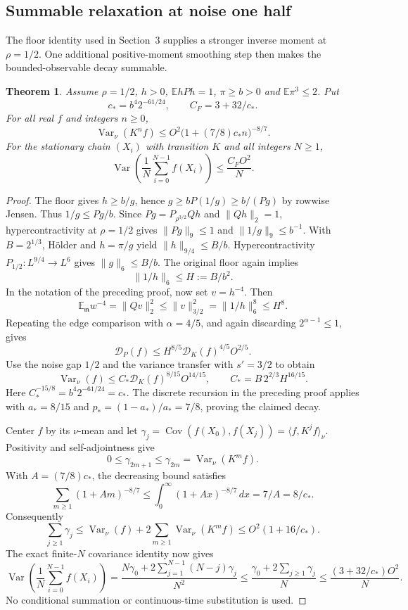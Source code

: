 \documentclass[11pt]{article}
\newcommand{\E}{\mathbb E}
\newtheorem{theorem}{Theorem}[section]
\begin{document}
\subsection{Summable relaxation at noise one half}
The floor identity used in Section~3 supplies a stronger inverse
moment at $\rho=1/2$. One additional positive-moment smoothing step
then makes the bounded-observable decay summable.
\begin{theorem}\label{summablerelaxation}
Assume $\rho=1/2$, $h>0$, $\E hPh=1$, $\pi\geq b>0$ and
$\E\pi^3\leq2$. Put
\[
 c_* = b^4 2^{-61/24},\qquad C_F=3+32/c_*.
\]
For all real $f$ and integers $n\geq0$,
\[
 \operatorname{Var}_\nu(K^n f)
 \leq O^2\bigl(1+(7/8)c_*n\bigr)^{-8/7}.
\]
For the stationary chain $(X_i)$ with transition $K$ and all integers
$N\geq1$,
\[
 \operatorname{Var}\left(\frac1N\sum_{i=0}^{N-1}f(X_i)\right)
 \leq \frac{C_F O^2}{N}.
\]
\end{theorem}
\begin{proof}
The floor gives $h\geq b/g$, hence
$g\geq bP(1/g)\geq b/(Pg)$ by rowwise Jensen. Thus $1/g\leq Pg/b$.
Since $Pg=P_{\rho^{3/2}}Qh$ and $\|Qh\|_2=1$, hypercontractivity at
$\rho=1/2$ gives $\|Pg\|_9\leq1$ and $\|1/g\|_9\leq b^{-1}$.
With $B=2^{1/3}$, H\"older and $h=\pi/g$ yield
$\|h\|_{9/4}\leq B/b$. Hypercontractivity
$P_{1/2}:L^{9/4}\to L^6$ gives $\|g\|_6\leq B/b$.
The original floor again implies
\[
 \|1/h\|_6\leq H:=B/b^2.
\]
In the notation of the preceding proof, now set $v=h^{-4}$. Then
\[
 \E_{\mathfrak m}w^{-4}
 =\|Qv\|_2^2\leq\|v\|_{3/2}^2=\|1/h\|_6^8\leq H^8.
\]
Repeating the edge comparison with $\alpha=4/5$, and again discarding
$2^{\alpha-1}\leq1$, gives
\[
 \mathcal D_P(f)\leq
 H^{8/5}\mathcal D_K(f)^{4/5}O^{2/5}.
\]
Use the noise gap $1/2$ and the variance transfer with $s'=3/2$ to obtain
\[
 \operatorname{Var}_\nu(f)
 \leq C_*\mathcal D_K(f)^{8/15}O^{14/15},\qquad
 C_*=B\,2^{2/3}H^{16/15}.
\]
Here $C_*^{-15/8}=b^4 2^{-61/24}=c_*$.
The discrete recursion in the preceding proof applies with
$a_*=8/15$ and $p_*=(1-a_*)/a_*=7/8$, proving the claimed decay.

Center $f$ by its $\nu$-mean and let
$\gamma_j=\operatorname{Cov}(f(X_0),f(X_j))
=\langle f,K^j f\rangle_\nu$. Positivity and self-adjointness give
\[
 0\leq\gamma_{2m+1}\leq
 \gamma_{2m}=\operatorname{Var}_\nu(K^m f).
\]
With $A=(7/8)c_*$, the decreasing bound satisfies
\[
 \sum_{m\geq1}(1+Am)^{-8/7}
 \leq\int_0^\infty(1+Ax)^{-8/7}\,dx
 =7/A=8/c_*.
\]
Consequently
\[
 \sum_{j\geq1}\gamma_j
 \leq\operatorname{Var}_\nu(f)
       +2\sum_{m\geq1}\operatorname{Var}_\nu(K^m f)
 \leq O^2(1+16/c_*).
\]
The exact finite-$N$ covariance identity now gives
\[
 \operatorname{Var}\left(\frac1N\sum_{i=0}^{N-1}f(X_i)\right)
 =\frac{N\gamma_0+2\sum_{j=1}^{N-1}(N-j)\gamma_j}{N^2}
 \leq\frac{\gamma_0+2\sum_{j\geq1}\gamma_j}{N}
 \leq\frac{(3+32/c_*)O^2}{N}.
\]
No conditional summation or continuous-time substitution is used.
\end{proof}
\end{document}
